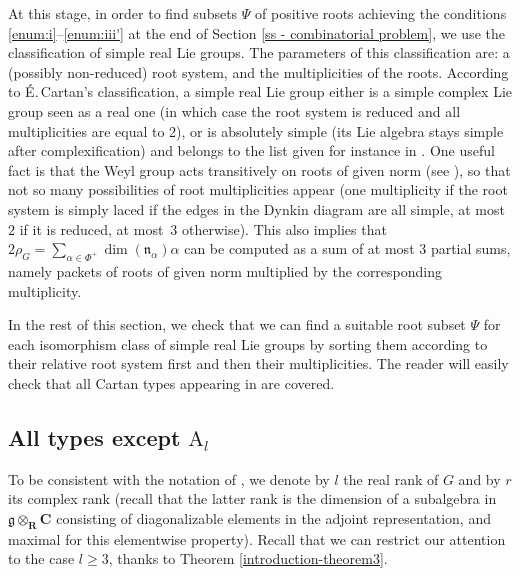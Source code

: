 \documentclass[JEP,XML,SOM,Unicode,published]{cedram}
\newcommand{\frg}{\mathfrak{g}}
\newcommand{\frn}{\mathfrak{n}}
\newcommand{\CC}{\mathbf{C}}
\newcommand{\RR}{\mathbf{R}}
\theoremstyle{plain}
\theoremstyle{remark}
\theoremstyle{definition}
\begin{document}
At this stage, in order to find subsets $\Psi$ of positive roots achieving the conditions \eqref{enum:i}--\eqref{enum:iii'} at the end of Section \ref{ss - combinatorial problem}, we use the classification of simple real Lie groups.
The parameters of this classification are: a (possibly non-reduced) root system, and the multiplicities of the roots.
According to É.\,Cartan's classification, a simple real Lie group either is a simple complex Lie group seen as a real one (in which case the root system is reduced and all multiplicities are equal to 2), or is absolutely simple (\ie its Lie algebra stays simple after complexification) and belongs to the list given for instance in \cite[Chap.\,X, Table VI, pp.\,532-534]{Helgason}.
One useful fact is that the Weyl group acts transitively on roots of given norm (see \cite[Lem.\,C, p.\,53]{Humphreys-LA}),
so that not so many possibilities of root multiplicities appear (one multiplicity if the root system is simply laced \ie if the edges in the Dynkin diagram are all simple,
at most~$2$ if it is reduced, at most~$3$ otherwise).
This also implies that $2 \rho_G = \sum_{\alpha \in \Phi^+} \dim(\frn_\alpha) \alpha$ can be computed as a sum of at most 3 partial sums, namely packets of roots of given norm multiplied by the corresponding multiplicity.

In the rest of this section, we check that we can find a suitable root subset $\Psi$ for each isomorphism class of simple real Lie groups by sorting them according to their relative root system first and then their multiplicities.
The reader will easily check that all Cartan types appearing in \cite[Chap.\,X, Table VI, pp.\,532-534]{Helgason} are covered.

\subsection{All types except $\mathrm A_l$}
To be consistent with the notation of \cite[Chap.\,X, Table VI, pp.\,532--534]{Helgason}, we denote by $l$ the real rank of $G$ and by $r$ its complex rank (recall that the latter rank is the dimension of a subalgebra in $\frg \otimes_\RR \CC$ consisting of diagonalizable elements in the adjoint representation, and maximal for this elementwise property).
Recall that we can restrict our attention to the case $l \geqslant 3$, thanks to Theorem \ref{introduction-theorem3}.
\end{document}
